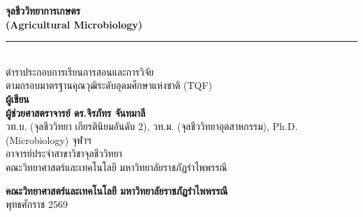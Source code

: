 \thispagestyle{empty}
\begin{center}
    \vspace*{1.5cm}
    
    {\fontsize{28}{34}\bfseries\color{agriGreen} จุลชีววิทยาการเกษตร}\\[10pt]
    {\fontsize{18}{22}\bfseries\color{agriLeaf} (Agricultural Microbiology)}\\[15pt]
    {\color{agriGold}\rule{0.6\textwidth}{2pt}}\\[20pt]
    
    {\fontsize{14}{18}\color{agriSlate} ตำราประกอบการเรียนการสอนและการวิจัย}\\[8pt]
    {\fontsize{12}{16}\color{slateGrey} ตามกรอบมาตรฐานคุณวุฒิระดับอุดมศึกษาแห่งชาติ (TQF)}\\[60pt]
    
    {\fontsize{14}{18}\bfseries\color{agriGreen} ผู้เขียน}\\[8pt]
    {\fontsize{20}{26}\bfseries\color{agriEarth} ผู้ช่วยศาสตราจารย์ ดร.จิรภัทร จันทมาลี}\\[10pt]
    {\fontsize{12.5}{16}\color{agriSlate} วท.บ. (จุลชีววิทยา เกียรตินิยมอันดับ 2), วท.ม. (จุลชีววิทยาอุตสาหกรรม), Ph.D. (Microbiology) จุฬาฯ}\\[6pt]
    {\fontsize{13}{16}\color{agriSlate} อาจารย์ประจำสาขาวิชาจุลชีววิทยา}\\[4pt]
    {\fontsize{13}{16}\color{agriSlate} คณะวิทยาศาสตร์และเทคโนโลยี มหาวิทยาลัยราชภัฏรำไพพรรณี}\\[80pt]
    
    \vfill
    
    {\fontsize{13}{16}\bfseries\color{agriGreen} คณะวิทยาศาสตร์และเทคโนโลยี มหาวิทยาลัยราชภัฏรำไพพรรณี}\\[6pt]
    {\fontsize{12}{15}\color{agriSlate} พุทธศักราช 2569}
\end{center}
\clearpage
